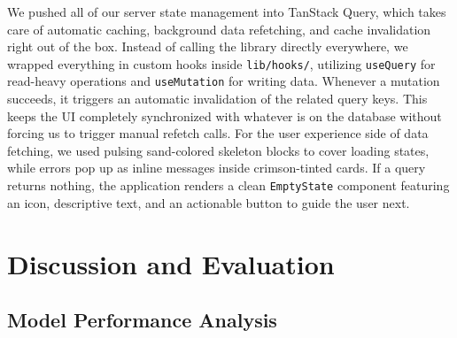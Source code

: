 \documentclass[12pt,a4paper]{article}
\begin{document}
We pushed all of our server state management into TanStack Query, which takes care of automatic caching, background data refetching, and cache invalidation right out of the box. Instead of calling the library directly everywhere, we wrapped everything in custom hooks inside \texttt{lib/hooks/}, utilizing \texttt{useQuery} for read-heavy operations and \texttt{useMutation} for writing data. Whenever a mutation succeeds, it triggers an automatic invalidation of the related query keys. This keeps the UI completely synchronized with whatever is on the database without forcing us to trigger manual refetch calls. For the user experience side of data fetching, we used pulsing sand-colored skeleton blocks to cover loading states, while errors pop up as inline messages inside crimson-tinted cards. If a query returns nothing, the application renders a clean \texttt{EmptyState} component featuring an icon, descriptive text, and an actionable button to guide the user next.



\clearpage
\section{Discussion and Evaluation}

\subsection{Model Performance Analysis}
\end{document}
